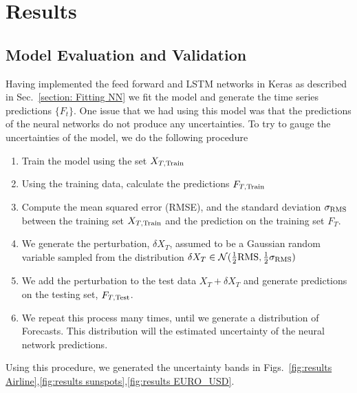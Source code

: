 \documentclass[10pt,a4paper]{article}
\begin{document}
\section{Results}
%
\subsection{Model Evaluation and Validation}
%
Having implemented the feed forward and LSTM networks in Keras as described in Sec.~\ref{section: Fitting NN} we fit the model and generate the time series predictions $\lbrace F_t \rbrace$. One issue that we had using this model was that the predictions of the neural networks do not produce any uncertainties. To try to gauge the uncertainties of the model, we do the following procedure \\
\begin{enumerate}
\item Train the model using the set $X_{T,{\rm Train}}$
\item Using the training data, calculate the predictions $F_{T,{\rm Train}}$
\item Compute the mean squared error (RMSE), and the standard deviation $\sigma_{\rm RMS}$ between the training set $X_{T,{\rm Train}}$ and the prediction on the training set $F_T$.
\item We generate the perturbation, $\delta X_{T}$, assumed to be a Gaussian random variable sampled from the distribution $\delta X_{T} \in \mathcal{N}(\frac{1}{2}{\rm RMS},\frac{1}{2}\sigma_{\rm RMS} )$
\item We add the perturbation to the test data $X_T +\delta X_{T}$ and generate predictions on the testing set, $F_{T,{\rm Test}}$.
\item We repeat this process many times, until we generate a distribution of Forecasts. This distribution will the estimated uncertainty of the neural network predictions.
\end{enumerate}
Using this procedure, we generated the uncertainty bands in Figs.~\ref{fig:results Airline},\ref{fig:results sunspots},\ref{fig:results EURO_USD}.
\end{document}
